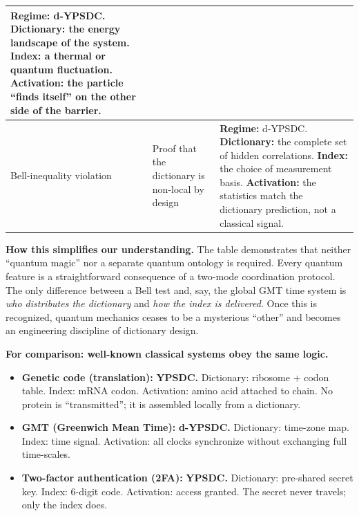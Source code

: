 \documentclass[12pt,a4paper]{article}
\theoremstyle{remark}
\begin{document}
\begin{table}[htbp]
\begin{tabular}{p{2.5cm} p{4.8cm} p{7.8cm}}
			\textbf{Regime:} d-YPSDC. \newline
			\textbf{Dictionary:} the energy landscape of the system. \newline
			\textbf{Index:} a thermal or quantum fluctuation. \newline
			\textbf{Activation:} the particle ``finds itself'' on the other side of the barrier. \\
			\midrule
			Bell-inequality violation &
			Proof that the dictionary is non-local by design &
			\textbf{Regime:} d-YPSDC. \newline
			\textbf{Dictionary:} the complete set of hidden correlations. \newline
			\textbf{Index:} the choice of measurement basis. \newline
			\textbf{Activation:} the statistics match the dictionary prediction, not a classical signal. \\
			\bottomrule
		\end{tabular}
	\end{table}
	
	\noindent
	\textbf{How this simplifies our understanding.}
	The table demonstrates that neither ``quantum magic'' nor a separate quantum ontology is required.
	Every quantum feature is a straightforward consequence of a two-mode coordination protocol.
	The only difference between a Bell test and, say, the global GMT time system is \emph{who distributes the dictionary} and \emph{how the index is delivered}.
	Once this is recognized, quantum mechanics ceases to be a mysterious ``other'' and becomes an engineering discipline of dictionary design.
	
	\textbf{For comparison: well-known classical systems obey the same logic.}
	\begin{itemize}
		\item \textbf{Genetic code (translation):} \textbf{YPSDC.} Dictionary: ribosome + codon table. Index: mRNA codon. Activation: amino acid attached to chain. No protein is ``transmitted''; it is assembled locally from a dictionary.
		\item \textbf{GMT (Greenwich Mean Time):} \textbf{d-YPSDC.} Dictionary: time-zone map. Index: time signal. Activation: all clocks synchronize without exchanging full time-scales.
		\item \textbf{Two-factor authentication (2FA):} \textbf{YPSDC.} Dictionary: pre-shared secret key. Index: 6-digit code. Activation: access granted. The secret never travels; only the index does.
	\end{itemize}
	
\end{document}
